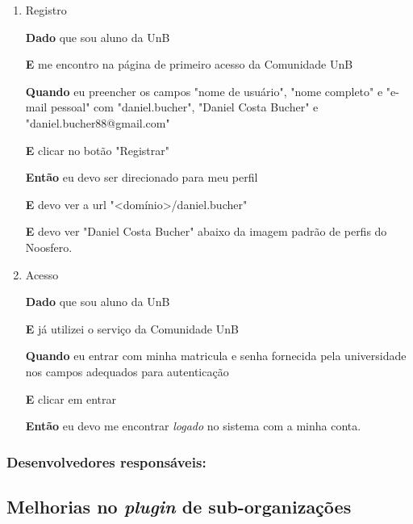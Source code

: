 \begin{enumerate}
\begin{enumerate}
\item Registro

\textbf{Dado} que sou aluno da UnB

\textbf{E} me encontro na página de primeiro acesso da Comunidade UnB

\textbf{Quando} eu preencher os campos "nome de usuário",
"nome completo" e "e-mail pessoal" com "daniel.bucher", "Daniel Costa Bucher" e
"daniel.bucher88@gmail.com"

\textbf{E} clicar no botão "Registrar"

\textbf{Então} eu devo ser direcionado para meu perfil

\textbf{E} devo ver a url "<domínio>/daniel.bucher"

\textbf{E} devo ver "Daniel Costa Bucher" abaixo da imagem padrão de perfis
do Noosfero.


\item Acesso

\textbf{Dado} que sou aluno da UnB

\textbf{E} já utilizei o serviço da Comunidade UnB

\textbf{Quando} eu entrar com minha matricula e senha fornecida pela universidade
nos campos adequados para autenticação

\textbf{E} clicar em entrar

\textbf{Então} eu devo me encontrar \textit{logado} no sistema com a minha conta.

\end{enumerate}

\end{enumerate}

\subsubsection*{Desenvolvedores responsáveis:}




\subsection{Melhorias no \textit{plugin} de sub-organizações}

